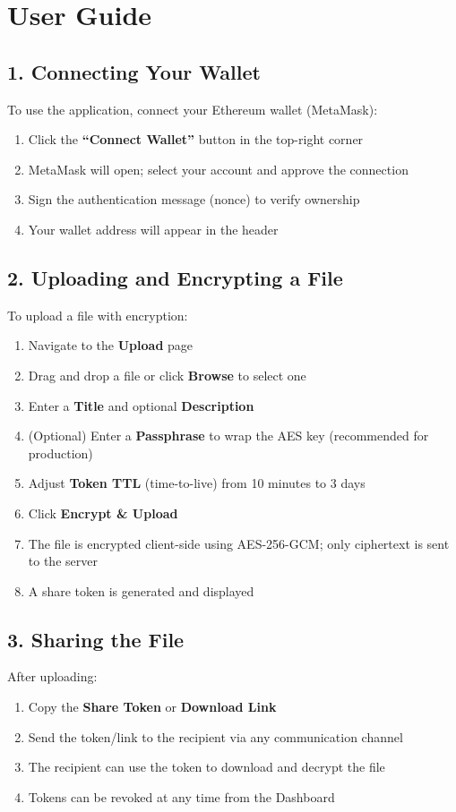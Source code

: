 \section{User Guide}
\subsection*{1. Connecting Your Wallet}
To use the application, connect your Ethereum wallet (MetaMask):
\begin{enumerate}
  \item Click the \textbf{``Connect Wallet''} button in the top-right corner
  \item MetaMask will open; select your account and approve the connection
  \item Sign the authentication message (nonce) to verify ownership
  \item Your wallet address will appear in the header
\end{enumerate}

\subsection*{2. Uploading and Encrypting a File}
To upload a file with encryption:
\begin{enumerate}
  \item Navigate to the \textbf{Upload} page
  \item Drag and drop a file or click \textbf{Browse} to select one
  \item Enter a \textbf{Title} and optional \textbf{Description}
  \item (Optional) Enter a \textbf{Passphrase} to wrap the AES key (recommended for production)
  \item Adjust \textbf{Token TTL} (time-to-live) from 10 minutes to 3 days
  \item Click \textbf{Encrypt \& Upload}
  \item The file is encrypted client-side using AES-256-GCM; only ciphertext is sent to the server
  \item A share token is generated and displayed
\end{enumerate}

\subsection*{3. Sharing the File}
After uploading:
\begin{enumerate}
  \item Copy the \textbf{Share Token} or \textbf{Download Link}
  \item Send the token/link to the recipient via any communication channel
  \item The recipient can use the token to download and decrypt the file
  \item Tokens can be revoked at any time from the Dashboard
\end{enumerate}

